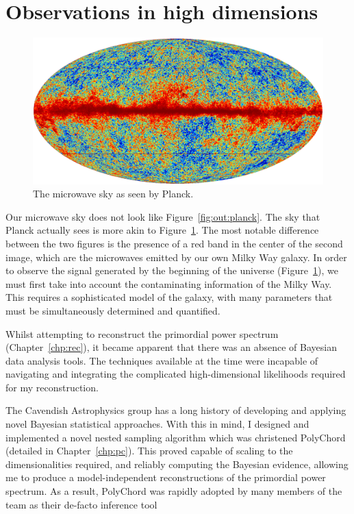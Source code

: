 \section{Observations in high dimensions}
\begin{figure}[tp]
  \includegraphics[width=\textwidth]{chapters/outline/figures/planck_galaxy}
  \caption{The microwave sky as seen by Planck.}\label{fig:out:planck_galaxy}
\end{figure}
Our microwave sky does not look like Figure~\ref{fig:out:planck}. The sky that Planck actually sees is more akin to Figure~\ref{fig:out:planck_galaxy}. The most notable difference between the two figures is the presence of a red band in the center of the second image, which are the microwaves emitted by our own Milky Way galaxy. In order to observe the signal generated by the beginning of the universe (Figure~\ref{fig:out:planck_galaxy}), we must first take into account the contaminating information of the Milky Way. This requires a sophisticated model of the galaxy, with many parameters that must be simultaneously determined and quantified. 

Whilst attempting to reconstruct the primordial power spectrum (Chapter~\ref{chp:rec}), it became apparent that there was an absence of Bayesian data analysis tools. The techniques available at the time were incapable of navigating and integrating the complicated high-dimensional likelihoods required for my reconstruction.

The Cavendish Astrophysics group has a long history of developing and applying novel Bayesian statistical approaches. With this in mind, I designed and implemented a novel nested sampling algorithm which was christened PolyChord (detailed in Chapter~\ref{chp:pc}). This proved capable of scaling to the dimensionalities required, and reliably computing  the Bayesian evidence, allowing me to produce a model-independent reconstructions of the primordial power spectrum.
As a result, PolyChord was rapidly adopted by many members of the team as their de-facto inference tool

